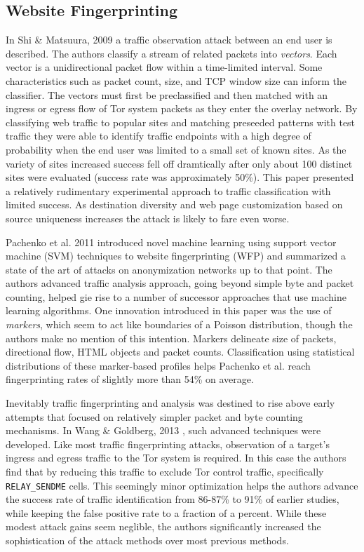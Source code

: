 \documentclass[sigconf]{acmart}
\begin{document}
\subsection{Website Fingerprinting}\label{subsec:website_fingerprinting}

In Shi \& Matsuura, 2009 \cite{shi_fingerprinting_2009} a traffic
observation attack between an end user is described.  The authors
classify a stream of related packets into \emph{vectors}.  Each vector
is a unidirectional packet flow within a time-limited interval.  Some
characteristics such as packet count, size, and TCP window size can
inform the classifier.  The vectors must first be preclassified and then
matched with an ingress or egress flow of Tor system packets as they
enter the overlay network.  By classifying web traffic to popular sites
and matching preseeded patterns with test traffic they were able to
identify traffic endpoints with a high degree of probability when the
end user was limited to a small set of known sites.  As the variety of
sites increased success fell off dramtically after only about 100
distinct sites were evaluated (success rate was approximately 50\%).
This paper presented a relatively rudimentary experimental approach to
traffic classification with limited success.  As destination diversity
and web page customization based on source uniqueness increases the
attack is likely to fare even worse.

Pachenko et al. 2011 \cite{panchenko_website_2011} introduced novel
machine learning using support vector machine (SVM) techniques to
website fingerprinting (WFP) and summarized a state of the art of
attacks on anonymization networks up to that point.  The authors
advanced traffic analysis approach, going beyond simple byte and packet
counting, helped gie rise to a number of successor approaches that use
machine learning algorithms.  One innovation introduced in this paper
was the use of \emph{markers}, which seem to act like boundaries of a
Poisson distribution, though the authors make no mention of this
intention.  Markers delineate size of packets, directional flow, HTML
objects and packet counts.  Classification using statistical
distributions of these marker-based profiles helps Pachenko et al.
reach fingerprinting rates of slightly more than 54\% on average.

Inevitably traffic fingerprinting and analysis was destined to rise
above early attempts that focused on relatively simpler packet and byte
counting mechanisms.  In Wang \& Goldberg, 2013
\cite{wang_improved_2013}, such advanced techniques were developed.
Like most traffic fingerprinting attacks, observation of a target's
ingress and egress traffic to the Tor system is required.  In this case
the authors find that by reducing this traffic to exclude Tor control
traffic, specifically \texttt{RELAY\_SENDME} cells.  This seemingly
minor optimization helps the authors advance the success rate of traffic
identification from 86-87\% to 91\% of earlier studies, while keeping
the false positive rate to a fraction of a percent.  While these modest
attack gains seem neglible, the authors significantly increased the
sophistication of the attack methods over most previous methods.
\end{document}
